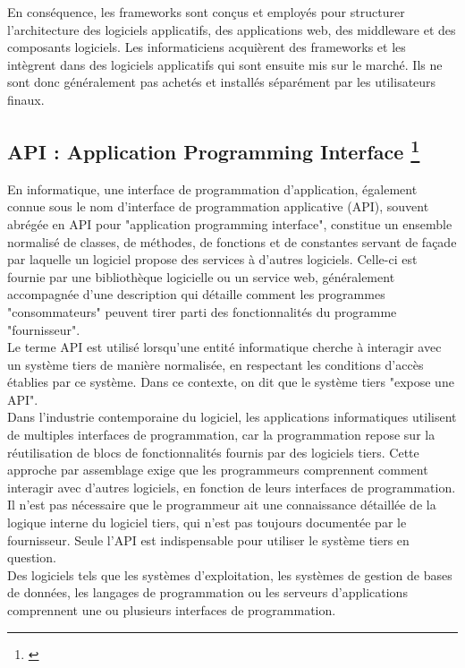 \documentclass[a4paper, 12pt, french]{article}
\begin{document}
			En conséquence, les frameworks sont conçus et employés pour structurer l'architecture des logiciels applicatifs, des applications web, des middleware et des composants logiciels. Les informaticiens acquièrent des frameworks et les intègrent dans des logiciels applicatifs qui sont ensuite mis sur le marché. Ils ne sont donc généralement pas achetés et installés séparément par les utilisateurs finaux.

		\subsection{API : Application Programming Interface \footnote{\cite{wikipediaAPI}}}%
			En informatique, une interface de programmation d'application, également connue sous le nom d'interface de programmation applicative (API), souvent abrégée en API pour "application programming interface", constitue un ensemble normalisé de classes, de méthodes, de fonctions et de constantes servant de façade par laquelle un logiciel propose des services à d'autres logiciels. Celle-ci est fournie par une bibliothèque logicielle ou un service web, généralement accompagnée d'une description qui détaille comment les programmes "consommateurs" peuvent tirer parti des fonctionnalités du programme "fournisseur".\\

			Le terme API est utilisé lorsqu'une entité informatique cherche à interagir avec un système tiers de manière normalisée, en respectant les conditions d'accès établies par ce système. Dans ce contexte, on dit que le système tiers "expose une API".\\

			Dans l'industrie contemporaine du logiciel, les applications informatiques utilisent de multiples interfaces de programmation, car la programmation repose sur la réutilisation de blocs de fonctionnalités fournis par des logiciels tiers. Cette approche par assemblage exige que les programmeurs comprennent comment interagir avec d'autres logiciels, en fonction de leurs interfaces de programmation. Il n'est pas nécessaire que le programmeur ait une connaissance détaillée de la logique interne du logiciel tiers, qui n'est pas toujours documentée par le fournisseur. Seule l'API est indispensable pour utiliser le système tiers en question.\\

			Des logiciels tels que les systèmes d'exploitation, les systèmes de gestion de bases de données, les langages de programmation ou les serveurs d'applications comprennent une ou plusieurs interfaces de programmation.
\end{document}
